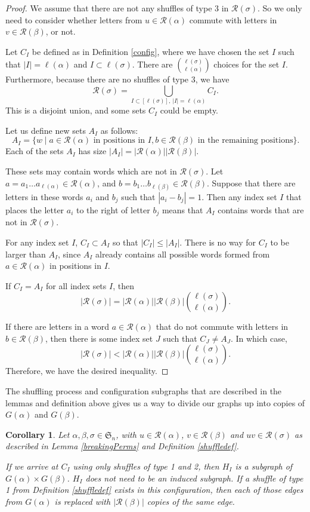 \documentclass[11pt,reqno]{amsart}
\newtheorem{corollary}[theorem]{Corollary}
\theoremstyle{definition}
\theoremstyle{notation}
\newcommand{\calR}{\mathcal{R}}
\begin{document}
\begin{proof}
We assume that there are not any shuffles of type 3 in $\calR(\sigma)$. So we only need to consider whether letters from $u\in \calR(\alpha)$ commute with letters in $v\in \calR(\beta)$, or not.

Let $C_I$ be defined as in Definition \ref{config}, where we have chosen the set $I$ such that $|I|=\ell(\alpha)$ and $I\subset \ell(\sigma)$. There are $\binom{\ell(\sigma)}{\ell(\alpha)}$ choices for the set $I$. Furthermore, because there are no shuffles of type 3, we have
\[
\calR(\sigma)= \bigcup_{I\subset [\ell(\sigma)], ~|I|=\ell(\alpha)}C_I.
\]
This is a disjoint union, and some sets $C_I$ could be empty.

Let us define new sets $A_I$ as follows: 
\[
A_I = \{w\mid a\in \calR(\alpha) \mbox{ in positions in }I, b\in \calR(\beta) \mbox{ in the remaining positions} \}.
\]
Each of the sets $A_I$ has size $|A_I|=|\calR(\alpha)||\calR(\beta)|$. 

These sets may contain words which are not in $\calR(\sigma)$. Let $a=a_1\ldots a_{\ell(\alpha)} \in \calR(\alpha)$, and $b=b_1\ldots b_{\ell(\beta)}\in \calR(\beta)$. Suppose that there are letters in these words $a_i$ and $b_j$ such that $|a_i-b_j|=1$. Then any index set $I$ that places the letter $a_i$ to the right of letter $b_j$ means that $A_I$ contains words that are not in $\calR(\sigma)$.

For any index set $I$, $C_I\subset A_I$ so that $|C_I|\leq |A_I|$. There is no way for $C_I$ to be larger than $A_I$, since $A_I$ already contains all possible words formed from $a\in \calR(\alpha)$ in positions in $I$. 

If $C_I=A_I$ for all index sets $I$, then 
\[
|\calR(\sigma)|= |\calR(\alpha)||\calR(\beta)|\binom{\ell(\sigma)}{\ell(\alpha)}.
\]

If there are letters in a word $a\in \calR(\alpha)$ that do not commute with letters in $b\in \calR(\beta)$, then there is some index set $J$ such that $C_J\neq A_J$. In which case,
\[
|\calR(\sigma)|< |\calR(\alpha)||\calR(\beta)|\binom{\ell(\sigma)}{\ell(\alpha)}.
\]
Therefore, we have the desired inequality.
\end{proof}

The shuffling process and configuration subgraphs that are described in the lemmas and definition above gives us a way to divide our graphs up into copies of $G(\alpha)$ and $G(\beta)$. 

\begin{corollary}\label{cor:nice_shuffle_graphs}
    Let $\alpha, \beta, \sigma\in \mathfrak{S}_n$, with $u\in \calR(\alpha)$, $v\in \calR(\beta)$ and $uv\in \calR(\sigma)$ as described in Lemma \ref{breakingPerms} and Definition \ref{shuffledef}. 

    If we arrive at $C_I$ using only shuffles of type 1 and 2, then $H_I$ is a subgraph of $G(\alpha)\times G(\beta)$. $H_I$ does not need to be an induced subgraph. If a shuffle of type 1 from Definition \ref{shuffledef} exists in this configuration, then each of those edges from $G(\alpha)$ is replaced with $|\calR(\beta)|$ copies of the same edge. 
\end{corollary}
\end{document}
